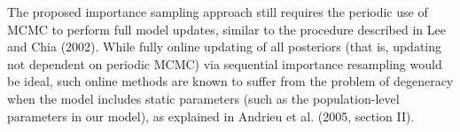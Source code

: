 \documentclass[letterpaper]{article}
\begin{document}
The proposed importance sampling approach still requires the periodic use of MCMC to perform full model updates, similar to the procedure described in Lee and Chia (2002)\nocite{Lee2002}. While fully online updating of all posteriors (that is, updating not dependent on periodic MCMC) via sequential importance resampling would be ideal, such online methods are known to suffer from the problem of degeneracy when the model includes static parameters (such as the population-level parameters in our model), as explained in Andrieu et al. (2005, section II)\nocite{Andrieu2005}.





\end{document}
